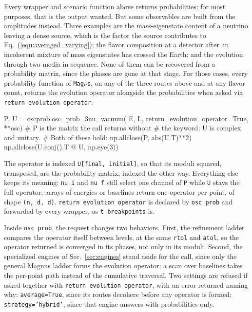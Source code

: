 \documentclass[final,5p,times,twocolumn,sort,compress]{elsarticle}
\makeatletter
\newcommand{\eq}{Eq.}
\DeclareRobustCommand{\_}{%
  \ifmmode\nfss@text{\textunderscore}\else\textunderscore\allowbreak\fi}
\newcommand{\equ}[1]{\eq~(\ref{equ:#1})}
\newcommand{\magnus}{{\tt Mag}\ensuremath{\nu}{\tt s}}
\makeatother
\begin{document}
Every wrapper and scenario function above returns probabilities; for most purposes, that is the output wanted. But some observables are built from the amplitudes instead. Three examples are the mass-eigenstate content of a neutrino leaving a dense source, which is the factor the source contributes to \equ{averaged_varying}; the flavor composition at a detector after an incoherent mixture of mass eigenstates has crossed the Earth; and the evolution through two media in sequence. None of them can be recovered from a probability matrix, since the phases are gone at that stage. For those cases, every probability function of \magnus, on any of the three routes above and at any flavor count, returns the evolution operator alongside the probabilities when asked via {\tt return\_evolution\_operator}:
\begin{pysnip}
P, U = oscprob.osc_prob_3nu_vacuum(
    E, L, return_evolution_operator=True,
    **osc)
# P is the matrix the call returns without
# the keyword; U is complex and unitary.
# Both of these hold:
np.allclose(P, abs(U.T)**2)
np.allclose(U.conj().T @ U, np.eye(3))
\end{pysnip}
The operator is indexed {\tt U[final, initial]}, so that its moduli squared, transposed, are the probability matrix, indexed the other way. Everything else keeps its meaning: {\tt nu\_i} and {\tt nu\_f} still select one channel of {\tt P} while {\tt U} stays the full operator; arrays of energies or baselines return one operator per point, of shape {\tt (n, d, d)}. {\tt return\_evolution\_operator} is declared by {\tt osc\_prob} and forwarded by every wrapper, as {\tt t\_breakpoints} is.

Inside {\tt osc\_prob}, the request changes two behaviors. First, the refinement ladder compares the operator itself between levels, at the same {\tt rtol} and {\tt atol}, so the operator returned is converged in its phases, not only in its moduli. Second, the specialized engines of Sec.~\ref{sec:engines} stand aside for the call, since only the general Magnus ladder forms the evolution operator; a scan over baselines takes the per-point path instead of the cumulative traversal. Two settings are refused if asked together with {\tt return\_evolution\_operator}, with an error returned naming why: {\tt average=True}, since its routes decohere before any operator is formed; {\tt strategy='hybrid'}, since that engine answers with probabilities only.
\end{document}

